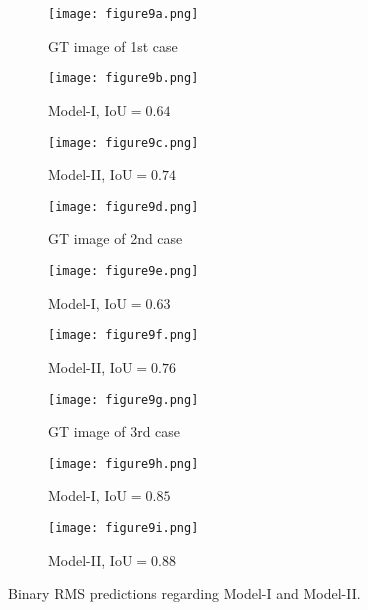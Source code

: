 \begin{sloppypar}
	
	\begin{figure}[ht!]
		\centering
		\begin{subfigure}[b]{0.32\textwidth}
			\centering
			\texttt{[image: figure9a.png]}
			\caption{GT image of 1st case}
			\label{fig:num_GT_391}
		\end{subfigure}
		\hfill
		\begin{subfigure}[b]{0.32\textwidth}
			\centering
			\texttt{[image: figure9b.png]}
			\caption{Model-I, IoU\(=0.64\)}
			\label{fig:Convlstm_binary_RMS_391}
		\end{subfigure}
		\hfill
		\begin{subfigure}[b]{0.32\textwidth}
			\centering
			\texttt{[image: figure9c.png]}
			\caption{Model-II, IoU\(=0.74\)}
			\label{fig:AE_binary_RMS_391}
		\end{subfigure}
		\par\medskip
		\begin{subfigure}[b]{0.32\textwidth}
			\centering
			\texttt{[image: figure9d.png]}
			\caption{GT image of 2nd case}
			\label{fig:num_GT_462}
		\end{subfigure}
		\hfill
		\begin{subfigure}[b]{0.32\textwidth}
			\centering
			\texttt{[image: figure9e.png]}
			\caption{Model-I, IoU\(=0.63\)}
			\label{fig:Convlstm_binary_RMS_462}
		\end{subfigure}
		\hfill
		\begin{subfigure}[b]{0.32\textwidth}
			\centering
			\texttt{[image: figure9f.png]}
			\caption{Model-II, IoU\(=0.76\)}
			\label{fig:AE_binary_RMS_462}
		\end{subfigure}
		\par\medskip
		\begin{subfigure}[b]{0.32\textwidth}
			\centering
			\texttt{[image: figure9g.png]}
			\caption{GT image of 3rd case}
			\label{fig:num_GT_453}
		\end{subfigure}
		\hfill	
		\begin{subfigure}[b]{0.32\textwidth}
			\centering
			\texttt{[image: figure9h.png]}
			\caption{Model-I, IoU\(=0.85\)}
			\label{fig:Convlstm_binary_RMS_453}
		\end{subfigure}
		\hfill
		\begin{subfigure}[b]{0.32\textwidth}
			\centering
			\texttt{[image: figure9i.png]}
			\caption{Model-II, IoU\(=0.88\)}
			\label{fig:AE_binary_RMS_453}
		\end{subfigure}
		\caption{Binary RMS predictions regarding Model-I and Model-II.}
		\label{fig:RMS_num_cases}
	\end{figure}
	

\end{sloppypar}
